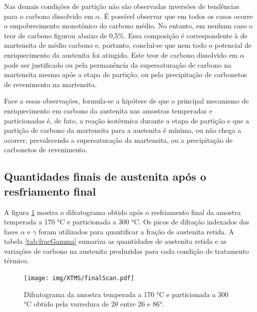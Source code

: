 Nas demais condições de partição não são observadas inversões de tendências para o carbono dissolvido em $\alpha$. É possível observar que em todos os casos ocorre o empobrecimento monotônico do carbono médio. No entanto, em nenhum caso o teor de carbono figurou abaixo de 0,5\%. Essa composição é correspondente à de martensita de médio carbono e, portanto, conclui-se que nem todo o potencial de enriquecimento da austenita foi atingido. Este teor de carbono dissolvido em $\alpha$ pode ser justificado ou pela permanência da supersaturação de carbono na martensita mesmo após a etapa de partição, ou pela precipitação de carbonetos de revenimento na martensita.

Face a essas observações, formula-se a hipótese de que o principal mecanismo de enriquecimento em carbono da austenita nas amostras temperadas e particionadas é, de fato, a reação isotérmica durante a etapa de partição e que a partição de carbono da martensita para a austenita é mínima, ou não chega a ocorrer, prevalecendo a supersaturação da martensita, ou a precipitação de carbonetos de revenimento.

\subsection{Quantidades finais de austenita após o resfriamento final}

A figura \ref{fig:finalScan} mostra o difratograma obtido após o resfriamento final da amostra temperada a 170 °C e particionada a 300 °C. Os picos de difração indexados das fases $\alpha$ e $\gamma$ foram utilizados para quantificar a fração de austenita retida. A tabela \ref{tab:fracGamma} sumariza as quantidades de austenita retida e as variações de carbono na austenita produzidas para cada condição de tratamento térmico.

\begin{figure}
	\texttt{[image: img/XTMS/finalScan.pdf]}
	\caption{Difratograma da amostra temperada a 170 °C e particionada a 300 °C obtido pela varredura de $2\theta$ entre 26 e 86°.}
	\label{fig:finalScan}
\end{figure}

